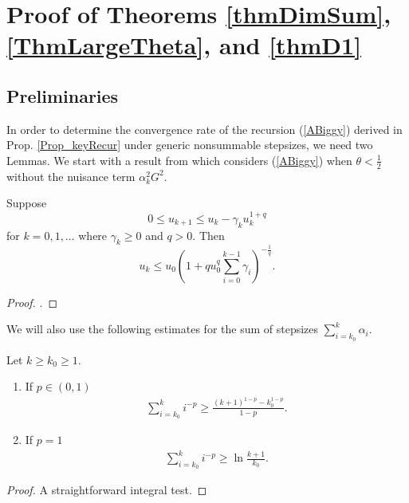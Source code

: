 \section{Proof of Theorems \ref{thmDimSum}, \ref{ThmLargeTheta}, and \ref{thmD1}}\label{secProofDecay}
\subsection{Preliminaries}\label{secProofDecay1}
In order to determine the convergence rate of the recursion (\ref{ABiggy}) derived in Prop. \ref{Prop_keyRecur} under generic nonsummable stepsizes, we need two Lemmas. We start with a result from \cite{PolyakIntro} which considers (\ref{ABiggy}) when $\theta<\frac{1}{2}$ without the nuisance term $\alpha_k^2 G^2$. 
\begin{lemma}
Suppose
$$
0\leq u_{k+1}\leq u_k - \gamma_k u_k^{1+q}
$$
for $k=0,1,\ldots$ where $\gamma_k\geq 0$ and $q>0$. Then 
$$
u_k
\leq
u_0\left(1+qu_0^q\sum_{i=0}^{k-1}\gamma_i\right)^{-\frac{1}{q}}.
$$\label{PolyakLemma2}
\end{lemma} 
\begin{proof}
\cite[Lemma 6 pp. 46]{PolyakIntro}.
\end{proof} 
We will also use the following estimates for the sum of stepsizes $\sum_{i=k_0}^k\alpha_i$. 
\begin{lemma}\label{sumSteps}
Let $k\geq k_0\geq 1$.
\begin{enumerate}
\item If $p\in(0,1)$
\begin{eqnarray*}
\sum_{i=k_0}^k i^{-p}\geq \frac{(k+1)^{1-p}-k_0^{1-p}}{1-p}.
\end{eqnarray*}
\item 
If $p=1$ 
\begin{eqnarray*}
\sum_{i=k_0}^ki^{-p}\geq \ln\frac{k+1}{k_0}.
\end{eqnarray*}
\end{enumerate} 	
\end{lemma}
\begin{proof}
A straightforward integral test.
\end{proof}



